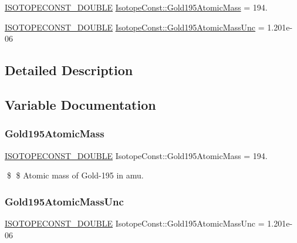 \begin{DoxyCompactItemize}
\item 
\mbox{\hyperlink{group___isotope_const-_macros_ga8f45a7272ce02c0b4c65c44636ed719a}{I\+S\+O\+T\+O\+P\+E\+C\+O\+N\+S\+T\+\_\+\+D\+O\+U\+B\+LE}} \mbox{\hyperlink{group___isotope_const-_gold-_au195_gac01d19e1c1d7ac002240deffc9065887}{Isotope\+Const\+::\+Gold195\+Atomic\+Mass}} = 194.
\item 
\mbox{\hyperlink{group___isotope_const-_macros_ga8f45a7272ce02c0b4c65c44636ed719a}{I\+S\+O\+T\+O\+P\+E\+C\+O\+N\+S\+T\+\_\+\+D\+O\+U\+B\+LE}} \mbox{\hyperlink{group___isotope_const-_gold-_au195_ga82b6d797a6e0b84be55a8aa43e3b24a9}{Isotope\+Const\+::\+Gold195\+Atomic\+Mass\+Unc}} = 1.\+201e-\/06
\end{DoxyCompactItemize}


\subsection{Detailed Description}


\subsection{Variable Documentation}
\mbox{\label{group___isotope_const-_gold-_au195_gac01d19e1c1d7ac002240deffc9065887}} 
\subsubsection{\texorpdfstring{Gold195\+Atomic\+Mass}{Gold195AtomicMass}}
{\footnotesize\ttfamily \mbox{\hyperlink{group___isotope_const-_macros_ga8f45a7272ce02c0b4c65c44636ed719a}{I\+S\+O\+T\+O\+P\+E\+C\+O\+N\+S\+T\+\_\+\+D\+O\+U\+B\+LE}} Isotope\+Const\+::\+Gold195\+Atomic\+Mass = 194.}

\$ \$ Atomic mass of Gold-\/195 in amu. \mbox{\label{group___isotope_const-_gold-_au195_ga82b6d797a6e0b84be55a8aa43e3b24a9}} 
\subsubsection{\texorpdfstring{Gold195\+Atomic\+Mass\+Unc}{Gold195AtomicMassUnc}}
{\footnotesize\ttfamily \mbox{\hyperlink{group___isotope_const-_macros_ga8f45a7272ce02c0b4c65c44636ed719a}{I\+S\+O\+T\+O\+P\+E\+C\+O\+N\+S\+T\+\_\+\+D\+O\+U\+B\+LE}} Isotope\+Const\+::\+Gold195\+Atomic\+Mass\+Unc = 1.\+201e-\/06}

